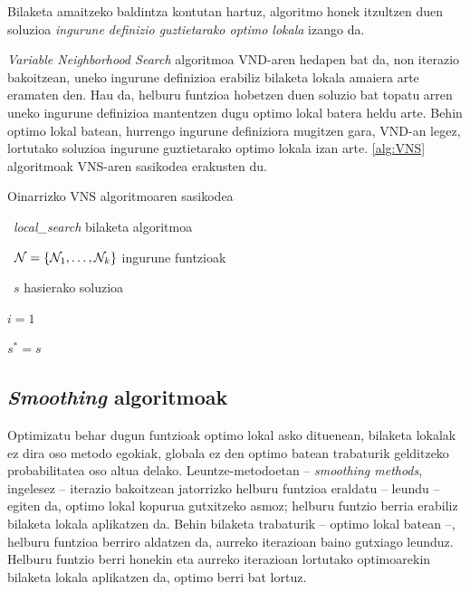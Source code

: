 \documentclass[eu]{ifirak}\usepackage[]{graphicx}\usepackage[]{color}
\begin{document}
Bilaketa amaitzeko baldintza kontutan hartuz, algoritmo honek itzultzen duen soluzioa \textit{ingurune definizio guztietarako optimo lokala} izango da.

\textit{Variable Neighborhood Search} algoritmoa VND-aren hedapen bat da, non iterazio bakoitzean, uneko ingurune definizioa erabiliz bilaketa lokala amaiera arte eramaten den. Hau da, helburu funtzioa hobetzen duen soluzio bat topatu arren uneko ingurune definizioa mantentzen dugu optimo lokal batera heldu arte. Behin optimo lokal batean, hurrengo ingurune definiziora mugitzen gara, VND-an legez, lortutako soluzioa ingurune guztietarako optimo lokala izan arte. \ref{alg:VNS} algoritmoak VNS-aren sasikodea erakusten du.

\begin{ifalgorithm} [t]
\begin{ifpseudo}{Oinarrizko VNS algoritmoaren sasikodea}
\item \In\ \textit{local\_search} bilaketa algoritmoa
\item \In\ $\mathbf{\cal N} = \{{\cal N}_1,\ldots,{\cal N}_k\}$ ingurune funtzioak
\item \In\ $s$ hasierako soluzioa
\item  $i=1$
\item  $s^* = s$
\item {} \Do
\item {}
\item {}
\item {}
\item {}
\item {}
\item \T{\Else}
\item {}
\item \T{\EIf}
\item \Done
\end{ifpseudo}
\caption{VNS algoritmoaren sasikodea}\label{alg:VNS}
\end{ifalgorithm}


\subsection{\textit{Smoothing} algoritmoak}

Optimizatu behar dugun funtzioak optimo lokal asko dituenean, bilaketa lokalak ez dira oso metodo egokiak, globala ez den optimo batean trabaturik gelditzeko probabilitatea oso altua delako. Leuntze-metodoetan -- \textit{smoothing methods}, ingelesez -- iterazio bakoitzean jatorrizko helburu funtzioa eraldatu -- leundu -- egiten da, optimo lokal kopurua gutxitzeko asmoz; helburu funtzio berria erabiliz bilaketa lokala aplikatzen da. Behin bilaketa trabaturik -- optimo lokal batean --, helburu funtzioa berriro aldatzen da, aurreko iterazioan baino gutxiago leunduz. Helburu funtzio berri honekin eta aurreko iterazioan lortutako optimoarekin bilaketa lokala aplikatzen da, optimo berri bat lortuz. 
\end{document}
